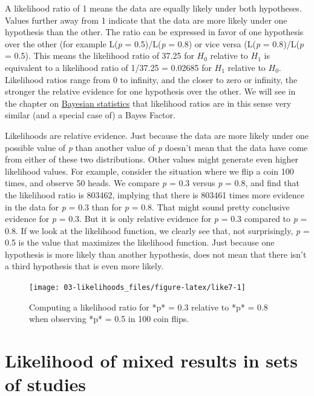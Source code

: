 \documentclass[
  oneside]{book}
\begin{document}
A likelihood ratio of 1 means the data are equally likely under both hypotheses. Values further away from 1 indicate that the data are more likely under one hypothesis than the other. The ratio can be expressed in favor of one hypothesis over the other (for example L(\emph{p} = 0.5)/L(\emph{p} = 0.8) or vice versa (L(\emph{p} = 0.8)/L(\emph{p} = 0.5). This means the likelihood ratio of 37.25 for \(H_0\) relative to \(H_1\) is equivalent to a likelihood ratio of 1/37.25 = 0.02685 for \(H_1\) relative to \(H_0\). Likelihood ratios range from 0 to infinity, and the closer to zero or infinity, the stronger the relative evidence for one hypothesis over the other. We will see in the chapter on \protect\hyperlink{bayes}{Bayesian statistics} that likelihood ratios are in this sense very similar (and a special case of) a Bayes Factor.

Likelihoods are relative evidence. Just because the data are more likely under one possible value of \emph{p} than another value of \emph{p} doesn't mean that the data have come from either of these two distributions. Other values might generate even higher likelihood values. For example, consider the situation where we flip a coin 100 times, and observe 50 heads. We compare \emph{p} = 0.3 versus \emph{p} = 0.8, and find that the likelihood ratio is 803462, implying that there is 803461 times more evidence in the data for \emph{p} = 0.3 than for \emph{p} = 0.8. That might sound pretty conclusive evidence for \emph{p} = 0.3. But it is only relative evidence for \emph{p} = 0.3 compared to \emph{p} = 0.8. If we look at the likelihood function, we clearly see that, not surprisingly, \emph{p} = 0.5 is the value that maximizes the likelihood function. Just because one hypothesis is more likely than another hypothesis, does not mean that there isn't a third hypothesis that is even more likely.

\begin{figure}

{\centering \texttt{[image: 03-likelihoods\_files/figure-latex/like7-1]} 

}

\caption{Computing a likelihood ratio for *p* = 0.3 relative to *p* = 0.8 when observing *p* = 0.5 in 100 coin flips.}\label{fig:like7}
\end{figure}

\hypertarget{likelihood-of-mixed-results-in-sets-of-studies}{%
\section{Likelihood of mixed results in sets of studies}\label{likelihood-of-mixed-results-in-sets-of-studies}}
\end{document}
